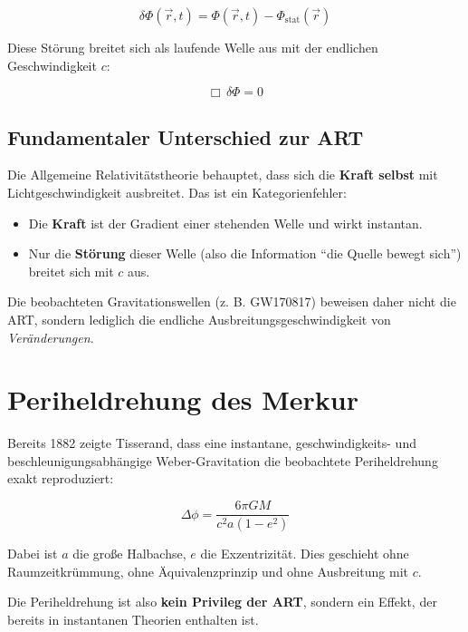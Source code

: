 \documentclass[11pt]{article}
\begin{document}
\begin{equation}
    \delta\Phi(\vec{r},t) = \Phi(\vec{r},t) - \Phi_{\text{stat}}(\vec{r})
\end{equation}

Diese Störung breitet sich als laufende Welle aus mit der endlichen Geschwindigkeit \(c\):

\begin{equation}
    \Box\, \delta\Phi = 0
\end{equation}

\subsection{Fundamentaler Unterschied zur ART}

Die Allgemeine Relativitätstheorie behauptet, dass sich die \textbf{Kraft selbst} mit Lichtgeschwindigkeit ausbreitet. Das ist ein Kategorienfehler:

\begin{itemize}
    \item Die \textbf{Kraft} ist der Gradient einer stehenden Welle und wirkt instantan.
    \item Nur die \textbf{Störung} dieser Welle (also die Information \enquote{die Quelle bewegt sich}) breitet sich mit \(c\) aus.
\end{itemize}

Die beobachteten Gravitationswellen (z. B. GW170817) beweisen daher nicht die ART, sondern lediglich die endliche Ausbreitungsgeschwindigkeit von \textit{Veränderungen}.

\section{Periheldrehung des Merkur}

Bereits 1882 zeigte Tisserand, dass eine instantane, geschwindigkeits- und beschleunigungsabhängige Weber-Gravitation die beobachtete Periheldrehung exakt reproduziert:

\begin{equation}
    \Delta\phi = \frac{6\pi GM}{c^2 a(1-e^2)}
\end{equation}

Dabei ist \(a\) die große Halbachse, \(e\) die Exzentrizität. Dies geschieht ohne Raumzeitkrümmung, ohne Äquivalenzprinzip und ohne Ausbreitung mit \(c\).

Die Periheldrehung ist also \textbf{kein Privileg der ART}, sondern ein Effekt, der bereits in instantanen Theorien enthalten ist.
\end{document}
